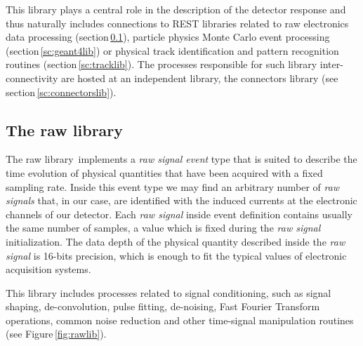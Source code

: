 This library plays a central role in the description of the detector response and thus naturally includes connections to REST libraries related to raw electronics data processing (section\,\ref{sc:rawlib}), particle physics Monte Carlo event processing (section\,\ref{sc:geant4lib}) or physical track identification and pattern recognition routines (section\,\ref{sc:tracklib}). The processes responsible for such library inter-connectivity are hosted at an independent library, the connectors library (see section\,\ref{sc:connectorslib}).

\subsection{The raw library}\label{sc:rawlib}

The raw library\,\cite{REST_Raw_Git} implements a \emph{raw signal event} type that is suited to describe the time evolution of physical quantities that have been acquired with a fixed sampling rate. Inside this event type we may find an arbitrary number of \emph{raw signals} that, in our case, are identified with the induced currents at the electronic channels of our detector. Each \emph{raw signal} inside event definition contains usually the same number of samples, a value which is fixed during the \emph{raw signal} initialization. The data depth of the physical quantity described inside the \emph{raw signal} is 16-bits precision, which is enough to fit the typical values of electronic acquisition systems.

This library includes processes related to signal conditioning, such as signal shaping, de-convolution, pulse fitting, de-noising, Fast Fourier Transform operations, common noise reduction and other time-signal manipulation routines (see Figure\,\ref{fig:rawlib}). 

